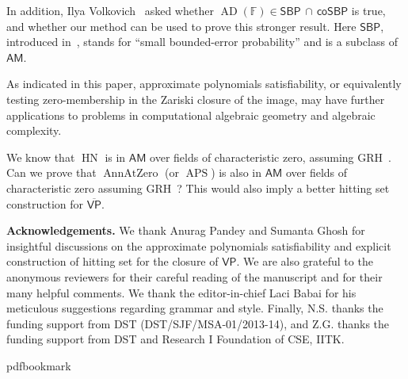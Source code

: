 \documentclass[11pt]{article}
\numberwithin{equation}{section}
\theoremstyle{definition}
\theoremstyle{plain}
\newcommand{\cclass}[1]{\textsf{#1}}
\newcommand{\F}{\mathbb{F}}
\newcommand{\AM}{\cclass{AM}\xspace}  %
\newcommand{\SBP}{\cclass{SBP}\xspace}  %
\newcommand{\coSBP}{\cclass{coSBP}\xspace}  %
\newcommand{\SBPcapcoSBP}{\SBP\,\cap\,\coSBP}  %
\newcommand{\VP}{\cclass{VP}\xspace}  %
\newcommand{\VPbar}{\overline{\VP}\xspace}  %
\DeclareMathOperator{\AD}{\mathrm{AD}\xspace} %
\DeclareMathOperator{\APS}{\mathrm{APS}\xspace} %
\DeclareMathOperator{\AnnAtZero}{\mathrm{AnnAtZero}\xspace} %
\DeclareMathOperator{\HN}{\mathrm{HN}\xspace} %
\begin{document}
 
In addition, Ilya Volkovich~\cite{Vol18} asked
%
%
%
%
whether $\AD(\F) \in \SBPcapcoSBP$ is true, and whether our method can be used to prove this stronger result. %
%
%
%
%
Here
%
%
%
%
$\SBP$, introduced in~\cite{BCM06},  %
stands for ``small bounded-error probability'' and is a subclass of $\AM$. %


\smallskip
 As indicated in this paper, approximate polynomials satisfiability, or equivalently testing zero-membership in the Zariski closure of the image, may have further applications to problems in computational algebraic geometry and algebraic complexity. 

 We know that
 $\HN$ %
 is in $\AM$ over fields of characteristic zero, assuming GRH~\cite{koiran1996hilbert}. Can we 
%
prove that $\AnnAtZero$ (or $\APS$) is also in $\AM$ over %
 fields of characteristic zero assuming GRH~\cite{Kay09}? This would also imply a better hitting set construction for %
 $\VPbar$.


\bigskip\noindent
\textbf{Acknowledgements.}
We thank Anurag Pandey and Sumanta Ghosh for insightful discussions on the approximate polynomials satisfiability and explicit construction of hitting set for the closure of 
%
$\VP$. %
We are also grateful to the anonymous reviewers for their careful reading of the manuscript and for their many helpful comments. We thank the editor-in-chief Laci Babai for his meticulous suggestions regarding grammar and style.
Finally, N.S. thanks the funding support from DST (DST/SJF/MSA-01/2013-14), and Z.G. thanks the funding support from DST and Research I Foundation of CSE, IITK.

\nocite{lidl}

\providecommand{\bibhead}[1]{}
\expandafter\ifx\csname pdfbookmark\endcsname\relax%
  \providecommand{\tocrefpdfbookmark}{}
\else\providecommand{\tocrefpdfbookmark}{%
   \hypertarget{tocreferences}{}%
   \pdfbookmark[1]{References}{tocreferences}}%
\fi
\end{document}
